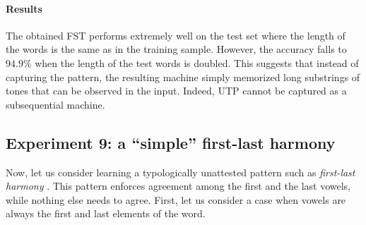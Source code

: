 \begin{table}[h!]
\centering
{}
\caption{Results of OSTIA learning UTP.}
\end{table}

\paragraph{Results}

The obtained FST performs extremely well on the test set where the length of the words is the same as in the training sample.
However, the accuracy falls to $94.9$\% when the length of the test words is doubled.
This suggests that instead of capturing the pattern, the resulting machine simply memorized long substrings of tones that can be observed in the input.
Indeed, UTP cannot be captured as a subsequential machine.

\subsection{Experiment 9: a ``simple'' first-last harmony}

Now, let us consider learning a typologically unattested pattern such as \emph{first-last harmony} \citep{Lai15}.
This pattern enforces agreement among the first and the last vowels, while nothing else needs to agree.
First, let us consider a case when vowels are always the first and last elements of the word.

